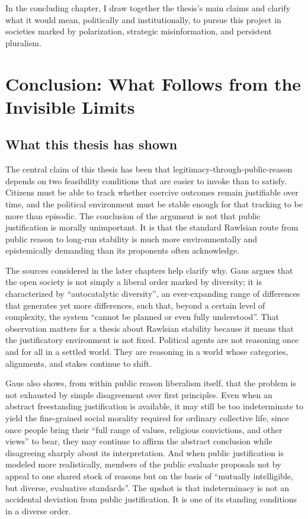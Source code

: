 \documentclass[12pt]{report}
\begin{document}
In the concluding chapter, I draw together the thesis’s main claims and clarify what it would mean, politically and institutionally, to pursue this project in societies marked by polarization, strategic misinformation, and persistent pluralism.

\chapter{Conclusion: What Follows from the Invisible Limits}

\section{What this thesis has shown}

The central claim of this thesis has been that legitimacy-through-public-reason depends on two feasibility conditions that are easier to invoke than to satisfy. Citizens must be able to track whether coercive outcomes remain justifiable over time, and the political environment must be stable enough for that tracking to be more than episodic. The conclusion of the argument is not that public justification is morally unimportant. It is that the standard Rawlsian route from public reason to long-run stability is much more environmentally and epistemically demanding than its proponents often acknowledge.

The sources considered in the later chapters help clarify why. Gaus argues that the open society is not simply a liberal order marked by diversity; it is 
characterized by \enquote{autocatalytic diversity}, an ever-expanding range of differences that generates yet more differences, such that, beyond a certain level of complexity, the system \enquote{cannot be planned or even fully understood}. \parencite[pp.~14--15]{gaus2021open}
That observation matters for a thesis about Rawlsian stability because it means that the justificatory environment is not fixed. Political agents are not reasoning once and for all in a settled world. They are reasoning in a world whose categories, alignments, and stakes continue to shift.

Gaus also shows, from within public reason liberalism itself, that the problem is not exhausted by simple disagreement over first principles. Even when an abstract freestanding justification is available, it may still be too indeterminate to yield the fine-grained social morality required for ordinary collective life, since once people bring their \enquote{full range of values, religious convictions, and other views} to bear, they may continue to affirm the abstract conclusion while disagreeing sharply about its interpretation. \parencite[p.~42]{gaus2011order}
And when public justification is modeled more realistically, members of the public evaluate proposals not by appeal to one shared stock of reasons but on the basis of \enquote{mutually intelligible, but diverse, evaluative standards}. \parencite[p.~283]{gaus2011order}
The upshot is that indeterminacy is not an accidental deviation from public justification. It is one of its standing conditions in a diverse order.
\end{document}
